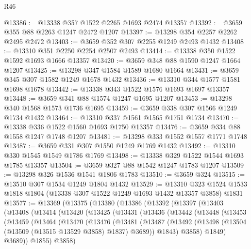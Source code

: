 \begin{lexlean}{R46}
\begin{coremodule}
@13386 := @13338 @357 @1522 @2265 @1693 @2474 @13357
@13392 := @3659 @355 @88 @2263 @1247 @2472 @1207
@13397 := @13298 @354 @2257 @2262 @2495 @2472
@13403 := @3659 @352 @307 @2255 @1249 @2493 @1432
@13408 := @13310 @351 @2250 @2254 @2507 @2493
@13414 := @13338 @350 @1522 @1592 @1693 @1666 @13357
@13420 := @3659 @348 @88 @1590 @1247 @1664 @1207
@13425 := @13298 @347 @1584 @1589 @1680 @1664
@13431 := @3659 @345 @307 @1582 @1249 @1678 @1432
@13436 := @13310 @344 @1577 @1581 @1698 @1678
@13442 := @13338 @343 @1522 @1576 @1693 @1697 @13357
@13448 := @3659 @341 @88 @1574 @1247 @1695 @1207
@13453 := @13298 @340 @1568 @1573 @1736 @1695
@13459 := @3659 @338 @307 @1566 @1249 @1734 @1432
@13464 := @13310 @337 @1561 @1565 @1751 @1734
@13470 := @13338 @336 @1522 @1560 @1693 @1750 @13357
@13476 := @3659 @334 @88 @1558 @1247 @1748 @1207
@13481 := @13298 @333 @1552 @1557 @1771 @1748
@13487 := @3659 @331 @307 @1550 @1249 @1769 @1432
@13492 := @13310 @330 @1545 @1549 @1786 @1769
@13498 := @13338 @329 @1522 @1544 @1693 @1785 @13357
@13504 := @3659 @327 @88 @1542 @1247 @1783 @1207
@13509 := @13298 @326 @1536 @1541 @1806 @1783
@13510 := @3659 @324
@13515 := @13510 @307 @1534 @1249 @1804 @1432
@13529 := @13310
    @323
    @1524
    @1533
    @1818
    @1804
    (@13338 @307 @1522 @1249 @1693 @1432 @13357 @3858)
    @1831
@13577 := @13369
    (@13375
      (@13380
        (@13386
          (@13392
            (@13397
              (@13403
                (@13408
                  (@13414
                    (@13420
                      (@13425
                        (@13431
                          (@13436
                            (@13442
                              (@13448
                                (@13453
                                  (@13459
                                    (@13464
                                      (@13470
                                        (@13476
                                          (@13481
                                            (@13487
                                              (@13492
                                                (@13498
                                                  (@13504
                                                    (@13509 (@13515 @13529 @3858) @1837)
                                                    @3689))
                                                @1843)
                                              @3858)
                                            @1849)
                                          @3689))
                                      @1855)
                                    @3858)

\end{coremodule}
\end{lexlean}
